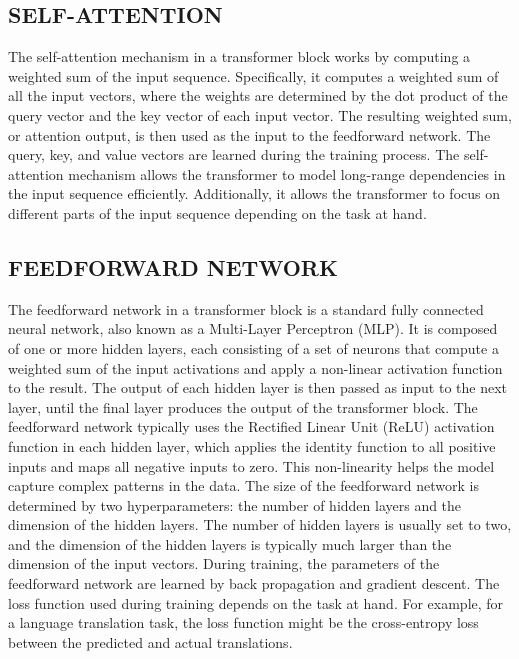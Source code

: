 \documentclass[letterpaper, 10pt, conference]{ieeeconf}
\begin{document}
    
    \subsection{SELF-ATTENTION} 
    
    The self-attention mechanism in a transformer block works by computing a weighted sum of the input sequence. Specifically, it
    computes a weighted sum of all the input vectors, where the weights are determined by the dot product of the query vector and the
    key vector of each input vector.
    The resulting weighted sum, or attention output, is then used as the input to the feedforward network. The query, key,
    and value vectors are learned during the training process.
    The self-attention mechanism allows the transformer to model long-range dependencies in the input sequence efficiently.
    Additionally, it allows the transformer to focus on different parts of the input sequence depending on the task at hand.
    

    
    
    \subsection{FEEDFORWARD NETWORK}
    
    The feedforward network in a transformer block is a standard fully connected neural network, also known as a Multi-Layer
    Perceptron (MLP). It is composed of one or more hidden layers, each consisting of a set of neurons that compute a weighted sum
    of the input activations and apply a non-linear activation function to the result. The output of each hidden layer is then passed as
    input to the next layer, until the final layer produces the output of the transformer block.
    The feedforward network typically uses the Rectified Linear Unit (ReLU) activation function in each hidden layer, which
    applies the identity function to all positive inputs and maps all negative inputs to zero. This non-linearity helps the model capture
    complex patterns in the data.
    The size of the feedforward network is determined by two hyperparameters: the number of hidden layers and the
    dimension of the hidden layers. The number of hidden layers is usually set to two, and the dimension of the hidden layers is typically
    much larger than the dimension of the input vectors.
    During training, the parameters of the feedforward network are learned by back propagation and gradient descent. The
    loss function used during training depends on the task at hand. For example, for a language translation task, the loss function might
    be the cross-entropy loss between the predicted and actual translations.
    
\end{document}
